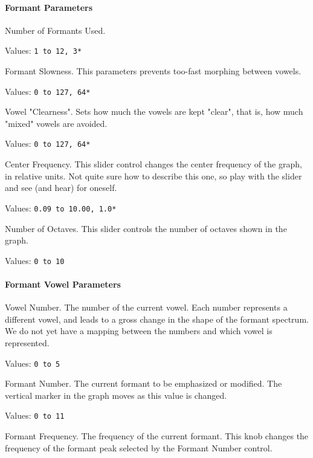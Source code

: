 \paragraph{Formant Parameters}
\label{paragraph:formant_parameters}

   Number of Formants Used.

   Values:  \texttt{1 to 12, 3*}

   Formant Slowness.
   This parameters prevents too-fast morphing between vowels.

   Values:  \texttt{0 to 127, 64*}

   Vowel "Clearness".
   Sets how much the vowels are kept "clear",
   that is, how much "mixed" vowels are avoided.

   Values:  \texttt{0 to 127, 64*}

   Center Frequency.
   This slider control changes the center frequency of the graph, in relative
   units.  Not quite sure how to describe this one, so play with the slider and
   see (and hear) for oneself.

   Values:  \texttt{0.09 to 10.00, 1.0*}

   Number of Octaves.
   This slider controls the number of octaves shown in the graph.

   Values:  \texttt{0 to 10}

\paragraph{Formant Vowel Parameters}
\label{paragraph:formant_vowel_parameters}

   Vowel Number.
   The number of the current vowel.
   Each number represents a different vowel, and leads to a gross change in the
   shape of the formant spectrum.
   We do not yet have a mapping between the numbers and which vowel is
   represented.

   Values:  \texttt{0 to 5}

   Formant Number.
   The current formant to be emphasized or modified.  The vertical marker in
   the graph moves as this value is changed.

   Values:  \texttt{0 to 11}

   Formant Frequency.
   The frequency of the current formant.
   This knob changes the frequency of the formant peak selected by the 
   Formant Number control.

